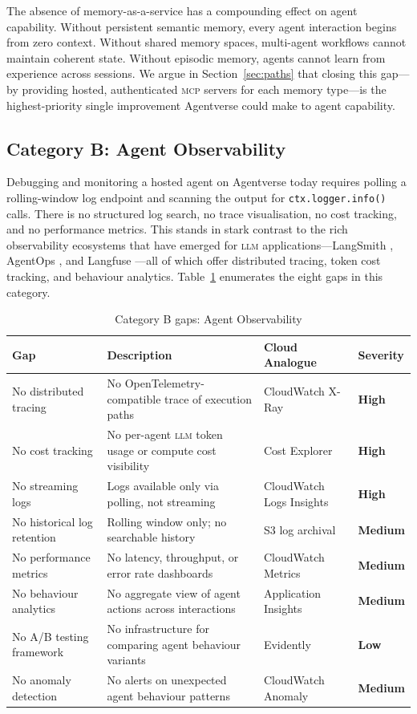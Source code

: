 \documentclass[twoside,11pt]{article}
\newcommand{\high}{\textcolor{red!70!black}{\textbf{High}}}
\newcommand{\medium}{\textcolor{orange!80!black}{\textbf{Medium}}}
\newcommand{\low}{\textcolor{green!50!black}{\textbf{Low}}}
\begin{document}
The absence of memory-as-a-service has a compounding effect on agent
capability.  Without persistent semantic memory, every agent interaction begins
from zero context.  Without shared memory spaces, multi-agent workflows cannot
maintain coherent state.  Without episodic memory, agents cannot learn from
experience across sessions.  We argue in Section~\ref{sec:paths} that closing
this gap---by providing hosted, authenticated \textsc{mcp} servers for each
memory type---is the highest-priority single improvement Agentverse could make
to agent capability.

\subsection{Category B: Agent Observability}
\label{subsec:gap-obs}

Debugging and monitoring a hosted agent on Agentverse today requires
polling a rolling-window log endpoint and scanning the
output for \texttt{ctx.logger.info()} calls.  There is no structured log
search, no trace visualisation, no cost tracking, and no performance metrics.
This stands in stark contrast to the rich observability ecosystems that have
emerged for \textsc{llm} applications---LangSmith \citep{langsmith2026},
AgentOps \citep{agentops2026}, and Langfuse \citep{langfuse2026}---all of
which offer distributed tracing, token cost tracking, and behaviour analytics.
Table~\ref{tab:gap-obs} enumerates the eight gaps in this category.

\begin{table}[htbp]
\centering
\caption{Category B gaps: Agent Observability}
\label{tab:gap-obs}
\begin{tabular}{p{3.2cm} p{5.5cm} p{2.9cm} l}
\toprule
\textbf{Gap} & \textbf{Description} & \textbf{Cloud Analogue} &
\textbf{Severity} \\
\midrule
No distributed tracing & No OpenTelemetry-compatible trace of execution paths &
CloudWatch X-Ray & \high \\[4pt]
No cost tracking & No per-agent \textsc{llm} token usage or compute cost
visibility & Cost Explorer & \high \\[4pt]
No streaming logs & Logs available only via polling, not streaming & CloudWatch
Logs Insights & \high \\[4pt]
No historical log retention & Rolling window only; no searchable history & S3
log archival & \medium \\[4pt]
No performance metrics & No latency, throughput, or error rate dashboards &
CloudWatch Metrics & \medium \\[4pt]
No behaviour analytics & No aggregate view of agent actions across interactions
& Application Insights & \medium \\[4pt]
No A/B testing framework & No infrastructure for comparing agent behaviour
variants & Evidently & \low \\[4pt]
No anomaly detection & No alerts on unexpected agent behaviour patterns &
CloudWatch Anomaly & \medium \\
\bottomrule
\end{tabular}
\end{table}
\end{document}
